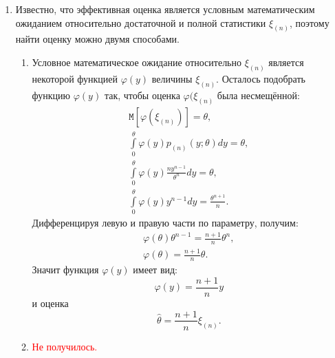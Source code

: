 \documentclass[a4paper,12pt]{article}
\newcommand{\expectation}[1]{\texttt{M} \left[ #1 \right]}
\begin{document}
\begin{enumerate}
\[\begin{array}{ll}
                  0,                          & 1 < x .
              \end{array}
              \right .
          \]
          Подставляя плотность $p_{(n)}(x; \theta)$ в интеграл математического ожидания, получим:
          \[
              \int \limits_0^\theta g(t) \frac{n x^{n-1}}{\theta^n} dx = 0 .
          \]
          Дифференцируя по $\theta$, получим:
          \begin{gather*}
              g(\theta) \frac{n \theta^{n-1}}{\theta^n} = 0 , \\
              g(\theta)  = 0 .
          \end{gather*}
          Таким образом, для функции $g(t)$:
          \[
              \forall \theta \in \Theta: \expectation{g(\xi_{(n)})} = 0 \Rightarrow g(t) = 0.
          \]
          поэтому статистика $\xi_{(n)}$ является полной.

    \item Известно, что эффективная оценка является условным математическим ожиданием относительно достаточной и полной статистики $\xi_{(n)}$,
          поэтому найти оценку можно двумя способами.
          \begin{enumerate}
              \item Условное математическое ожидание относительно $\xi_{(n)}$ является некоторой функцией $\varphi(y)$ величины $\xi_{(n)}$.
                    Осталось подобрать функцию $\varphi(y)$ так, чтобы оценка $\varphi(\xi_{(n)}$ была несмещённой:
                    \begin{gather*}
                        \expectation{\varphi(\xi_{(n)})} = \theta , \\
                        \int \limits_0^{\theta} \varphi(y) p_{(n)}(y; \theta) dy = \theta , \\
                        \int \limits_0^{\theta} \varphi(y) \frac{n y^{n-1}}{\theta^n} dy = \theta , \\
                        \int \limits_0^{\theta} \varphi(y) y^{n-1} dy = \frac{\theta^{n+1}}{n} .
                    \end{gather*}
                    Дифференцируя левую и правую части по параметру, получим:
                    \begin{gather*}
                        \varphi(\theta) \theta^{n-1} = \frac{n+1}{n} \theta^n , \\
                        \varphi(\theta) = \frac{n+1}{n} \theta .
                    \end{gather*}
                    Значит функция $\varphi(y)$ имеет вид:
                    \[
                        \varphi(y) = \frac{n+1}{n} y
                    \]
                    и оценка
                    \[
                        \widehat{\theta} = \frac{n+1}{n} \xi_{(n)} .
                    \]
              \item \textcolor{red}{Не получилось.}


\end{enumerate}
\end{enumerate}
\end{document}
